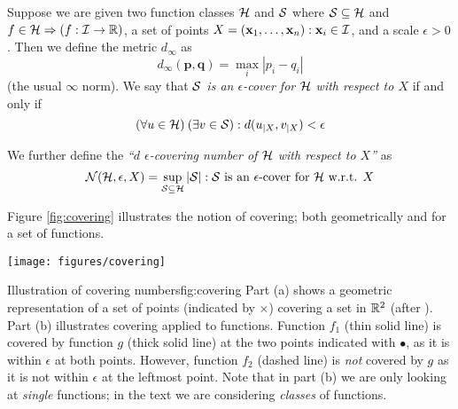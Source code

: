 \begin{definition}
\label{def:covering}
\label{def:covering numbers}
Suppose we are given two function classes $\mathcal{H}$ and $\mathcal{S}$ where $\mathcal{S}
\subseteq \mathcal{H}$ and $f \in \mathcal{H} \Rightarrow (f : \mathcal{I} \rightarrow
\mathbb{R})$, a set of points $X = (\mathbf{x}_1, \ldots, \mathbf{x}_n) : \mathbf{x}_i \in
\mathcal{I}$, and a scale $\epsilon > 0$.  Then we define the metric
$d_{\infty}$ as 
%
\begin{equation}
d_{\infty}(\mathbf{p}, \mathbf{q}) = \max_{i} |p_i - q_i|
\end{equation}
%
(the usual $\infty$ norm).  We say that \emph{$\mathcal{S}$ is an
$\epsilon$-cover for $\mathcal{H}$ with respect to $X$} if and only if 
%
\begin{equation}
(\forall u \in \mathcal{H})\:(\exists v \in \mathcal{S}) : d(u_{|X}, v_{|X}) < \epsilon
\end{equation}

We further define the \emph{``$d$ $\epsilon$-covering number of
$\mathcal{H}$ with respect to $X$''} as
% 
\begin{equation}
\mathcal{N}({\mathcal{H}}, {\epsilon}, {X}) = \sup_{\mathcal{S} \subseteq
\mathcal{H}}|\mathcal{S}| : \mbox{$\mathcal{S}$ is an $\epsilon$-cover for $\mathcal{H}$
w.r.t. $X$}
\end{equation}
\end{definition}

Figure \ref{fig:covering} illustrates the notion of covering; both
geometrically and for a set of functions.

\begin{linefigure}
\begin{center}
\texttt{[image: figures/covering]}
\end{center}
\begin{capt}{Illustration of covering numbers}{fig:covering}
Part (a) shows a geometric representation of a set of points
(indicated by $\times$) covering a set in $\mathbb{R}^2$ (after
\cite{Anthony98}).  Part (b) illustrates covering applied to
functions.  Function $f_1$ (thin solid line) is covered by function
$g$ (thick solid line) at the two points indicated with $\bullet$, as
it is within $\epsilon$ at both points. However, function $f_2$
(dashed line) is \emph{not} covered by $g$ as it is not within
$\epsilon$ at the leftmost point.  Note that in part (b) we are only
looking at \emph{single} functions; in the text we are considering
\emph{classes} of functions.
\end{capt}
\end{linefigure}

